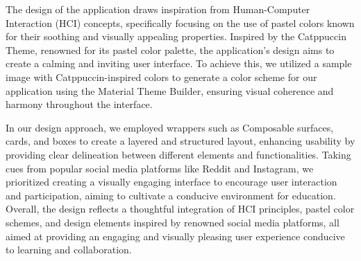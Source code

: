 The design of the application draws inspiration from Human-Computer Interaction (HCI) concepts, specifically focusing on the use of pastel colors known for their soothing and visually appealing properties. Inspired by the Catppuccin Theme, renowned for its pastel color palette, the application's design aims to create a calming and inviting user interface. To achieve this, we utilized a sample image with Catppuccin-inspired colors to generate a color scheme for our application using the Material Theme Builder, ensuring visual coherence and harmony throughout the interface.

In our design approach, we employed wrappers such as Composable surfaces, cards, and boxes to create a layered and structured layout, enhancing usability by providing clear delineation between different elements and functionalities. Taking cues from popular social media platforms like Reddit and Instagram, we prioritized creating a visually engaging interface to encourage user interaction and participation, aiming to cultivate a conducive environment for education. Overall, the design reflects a thoughtful integration of HCI principles, pastel color schemes, and design elements inspired by renowned social media platforms, all aimed at providing an engaging and visually pleasing user experience conducive to learning and collaboration.